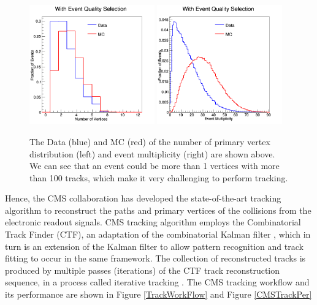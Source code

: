 \begin{figure}[hbtp]
\begin{center}
\includegraphics[width=0.48\textwidth]{Figures/Chapter4/Vertex.png}
\includegraphics[width=0.48\textwidth]{Figures/Chapter4/Multiplicity.png}
\caption{The Data (blue) and MC (red) of the number of primary vertex distribution (left) and event multiplicity (right) are shown above. We can see that an event could be more than 1 vertices with more than 100 tracks, which make it very challenging to perform tracking.}
\label{CMSEvtInfo}
\end{center}
\end{figure} 

Hence, the CMS collaboration has developed the state-of-the-art tracking algorithm to reconstruct the paths and primary vertices of the collisions from the electronic readout signals. CMS tracking algorithm employs the Combinatorial Track Finder (CTF), an adaptation of the combinatorial Kalman filter \cite{CMSTrack1,CMSTrack2,CMSTrack3}, which in turn is an extension of the Kalman filter \cite{Kalman} to allow pattern recognition and track fitting to occur in the same framework. The collection of reconstructed tracks is produced by multiple passes (iterations) of the CTF track reconstruction sequence, in a process called iterative tracking \cite{CMSTrackComp}. The CMS tracking workflow and its performance are shown in Figure \ref{TrackWorkFlow} and Figure \ref{CMSTrackPer}



